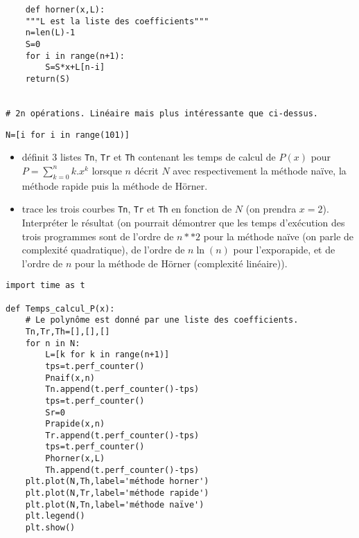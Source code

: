 	
	
	\begin{lstlisting}
	def horner(x,L):
    """L est la liste des coefficients"""
    n=len(L)-1
    S=0
    for i in range(n+1):
        S=S*x+L[n-i]
    return(S)
    
    
# 2n opérations. Linéaire mais plus intéressante que ci-dessus.

\end{lstlisting}



	
	
\begin{lstlisting}
N=[i for i in range(101)]
\end{lstlisting}

\begin{itemize}
\item définit 3 listes \texttt{Tn}, \texttt{Tr} et \texttt{Th} contenant les temps de calcul de $P(x)$ pour $P=\displaystyle\sum_{k=0}^n k.x^k$ lorsque $n$ décrit $N$ avec respectivement la méthode naïve, la méthode rapide puis la méthode de Hörner.\\
\item trace les trois courbes  \texttt{Tn}, \texttt{Tr} et \texttt{Th} en fonction de $N$ (on prendra $x=2$). Interpréter le résultat (on pourrait démontrer que les temps d'exécution des trois programmes sont de l'ordre de $n**2$ pour la méthode naïve (on parle de complexité quadratique), de l'ordre de $n\ln(n)$ pour l'exporapide, et de l'ordre de $n$ pour la méthode de Hörner (complexité linéaire)). 
\end{itemize}


\begin{lstlisting}
import time as t

def Temps_calcul_P(x):
    # Le polynôme est donné par une liste des coefficients.
    Tn,Tr,Th=[],[],[]
    for n in N:
        L=[k for k in range(n+1)]
        tps=t.perf_counter()
        Pnaif(x,n)
        Tn.append(t.perf_counter()-tps)
        tps=t.perf_counter()
        Sr=0
        Prapide(x,n)
        Tr.append(t.perf_counter()-tps)
        tps=t.perf_counter()
        Phorner(x,L)
        Th.append(t.perf_counter()-tps)
    plt.plot(N,Th,label='méthode horner')
    plt.plot(N,Tr,label='méthode rapide')
    plt.plot(N,Tn,label='méthode naïve')
    plt.legend()
    plt.show()

\end{lstlisting}
	

